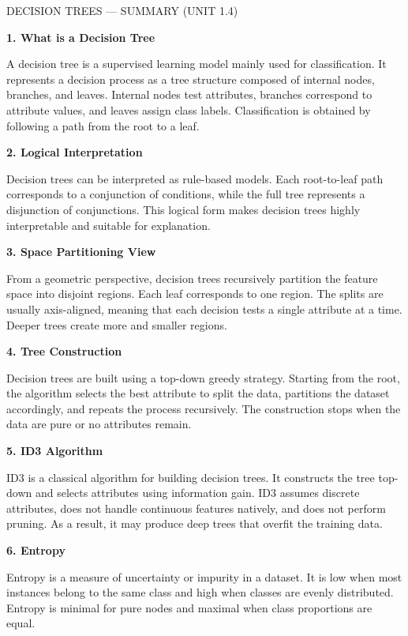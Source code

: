 \documentclass{article}
\begin{document}
	
	DECISION TREES — SUMMARY (UNIT 1.4)
	
	\bigskip
	
	\textbf{1. What is a Decision Tree}
	
	A decision tree is a supervised learning model mainly used for classification.
	It represents a decision process as a tree structure composed of internal nodes,
	branches, and leaves. Internal nodes test attributes, branches correspond to
	attribute values, and leaves assign class labels. Classification is obtained
	by following a path from the root to a leaf.
	
	\bigskip
	
	\textbf{2. Logical Interpretation}
	
	Decision trees can be interpreted as rule-based models. Each root-to-leaf path
	corresponds to a conjunction of conditions, while the full tree represents a
	disjunction of conjunctions. This logical form makes decision trees highly
	interpretable and suitable for explanation.
	
	\bigskip
	
	\textbf{3. Space Partitioning View}
	
	From a geometric perspective, decision trees recursively partition the feature
	space into disjoint regions. Each leaf corresponds to one region. The splits are
	usually axis-aligned, meaning that each decision tests a single attribute at a
	time. Deeper trees create more and smaller regions.
	
	\bigskip
	
	\textbf{4. Tree Construction}
	
	Decision trees are built using a top-down greedy strategy. Starting from the
	root, the algorithm selects the best attribute to split the data, partitions
	the dataset accordingly, and repeats the process recursively. The construction
	stops when the data are pure or no attributes remain.
	
	\bigskip
	
	\textbf{5. ID3 Algorithm}
	
	ID3 is a classical algorithm for building decision trees. It constructs the tree
	top-down and selects attributes using information gain. ID3 assumes discrete
	attributes, does not handle continuous features natively, and does not perform
	pruning. As a result, it may produce deep trees that overfit the training data.
	
	\bigskip
	
	\textbf{6. Entropy}
	
	Entropy is a measure of uncertainty or impurity in a dataset. It is low when most
	instances belong to the same class and high when classes are evenly distributed.
	Entropy is minimal for pure nodes and maximal when class proportions are equal.
	
\end{document}
